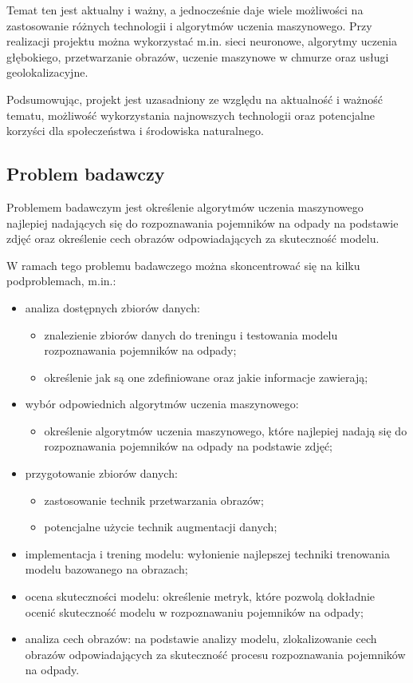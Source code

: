 \documentclass[12pt, a4paper, twoside, openany]{book}
\newcommand{\forceindent}{\leavevmode{\parindent=1.3em\indent}}
\begin{document}
Temat ten jest aktualny i ważny, a jednocześnie daje wiele możliwości na zastosowanie różnych technologii i algorytmów uczenia maszynowego. Przy realizacji projektu można wykorzystać m.in. sieci neuronowe, algorytmy uczenia głębokiego, przetwarzanie obrazów, uczenie maszynowe w chmurze oraz usługi geolokalizacyjne.

Podsumowując, projekt \topic jest uzasadniony ze względu na aktualność i ważność tematu, możliwość wykorzystania najnowszych technologii oraz potencjalne korzyści dla społeczeństwa i środowiska naturalnego.

\subsection{Problem badawczy}

\forceindent Problemem badawczym jest określenie algorytmów uczenia maszynowego najlepiej nadających się do rozpoznawania pojemników na odpady na podstawie zdjęć oraz określenie cech obrazów odpowiadających za skuteczność modelu.

W ramach tego problemu badawczego można skoncentrować się na kilku podproblemach, m.in.:
\begin{itemize}
    \item analiza dostępnych zbiorów danych:
          \begin{itemize}
              \item znalezienie zbiorów danych do treningu i testowania modelu rozpoznawania pojemników na odpady;
              \item określenie jak są one zdefiniowane oraz jakie informacje zawierają;
          \end{itemize}
    \item wybór odpowiednich algorytmów uczenia maszynowego:
          \begin{itemize}
              \item określenie algorytmów uczenia maszynowego, które najlepiej nadają się do rozpoznawania pojemników na odpady na podstawie zdjęć;
          \end{itemize}
    \item przygotowanie zbiorów danych:
          \begin{itemize}
              \item zastosowanie technik przetwarzania obrazów;
              \item potencjalne użycie technik augmentacji danych;
          \end{itemize}
    \item implementacja i trening modelu: wyłonienie najlepszej techniki trenowania modelu bazowanego na obrazach;
    \item ocena skuteczności modelu: określenie metryk, które pozwolą dokładnie ocenić skuteczność modelu w rozpoznawaniu pojemników na odpady;
    \item analiza cech obrazów: na podstawie analizy modelu, zlokalizowanie cech obrazów odpowiadających za skuteczność procesu rozpoznawania pojemników na odpady.
\end{itemize}
\end{document}
